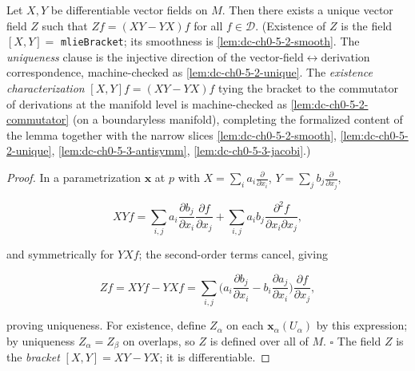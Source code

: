 \begin{lemma}
  \label{lem:dc-ch0-5-2}
  \leanok
  Let $X,Y$ be differentiable vector fields on $M$. Then there exists a unique
  vector field $Z$ such that $Zf=(XY-YX)f$ for all $f\in\mathcal{D}$.
  (Existence of $Z$ is the field $[X,Y]=$ \texttt{mlieBracket}; its smoothness is
  \cref{lem:dc-ch0-5-2-smooth}. The \emph{uniqueness} clause is the injective
  direction of the vector-field$\leftrightarrow$derivation correspondence,
  machine-checked as \cref{lem:dc-ch0-5-2-unique}. The \emph{existence
  characterization} $[X,Y]f=(XY-YX)f$ tying the bracket to the commutator of
  derivations at the manifold level is machine-checked as
  \cref{lem:dc-ch0-5-2-commutator} (on a boundaryless manifold), completing the
  formalized content of the lemma together with the narrow slices
  \cref{lem:dc-ch0-5-2-smooth}, \cref{lem:dc-ch0-5-2-unique},
  \cref{lem:dc-ch0-5-3-antisymm}, \cref{lem:dc-ch0-5-3-jacobi}.)
\end{lemma}
\begin{proof}
  \leanok
  In a parametrization $\mathbf{x}$ at $p$ with
  $X=\sum_i a_i\frac{\partial}{\partial x_i}$,
  $Y=\sum_j b_j\frac{\partial}{\partial x_j}$,
  
  $$
  XYf=\sum_{i,j}a_i\frac{\partial b_j}{\partial x_i}\frac{\partial f}{\partial x_j}+\sum_{i,j}a_i b_j\frac{\partial^2 f}{\partial x_i\partial x_j},
  $$
  
  and symmetrically for $YXf$; the second-order terms cancel, giving
  
  $$
  Zf=XYf-YXf=\sum_{i,j}\Big(a_i\frac{\partial b_j}{\partial x_i}-b_i\frac{\partial a_j}{\partial x_i}\Big)\frac{\partial f}{\partial x_j},
  $$
  
  proving uniqueness. For existence, define $Z_\alpha$ on each
  $\mathbf{x}_\alpha(U_\alpha)$ by this expression; by uniqueness $Z_\alpha=Z_\beta$
  on overlaps, so $Z$ is defined over all of $M$. $\square$ The field $Z$ is the
  \emph{bracket} $[X,Y]=XY-YX$; it is differentiable.
\end{proof}

